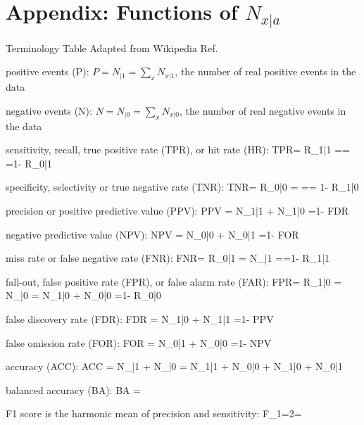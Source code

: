 \documentclass[12pt]{article}
\begin{document}
\appendix 

\section{Appendix: Functions of $N_{x|a}$}
\label{app-n-ratios}

Terminology Table
Adapted from Wikipedia Ref.\cite{wiki-roc}

positive events (P):
$P=N_{|1}=\sum_x N_{x|1}$,
the number of real positive 
events in the data

negative events (N):
$N=N_{|0}=\sum_x N_{x|0}$,
the number of real negative events in the data


sensitivity, recall, true positive rate (TPR),
or hit rate  ({\color{red}HR}):
\beq TPR=
{  {R_{1|1}} ={}=
{}=1- {R_{0|1}} }
\eeq

specificity, selectivity or true negative rate (TNR):
\beq TNR=
{  {R_{0|0}} ={}
={}=
1- {R_{1|0}} }
\eeq

precision or positive predictive value (PPV):
\beq 
{  {PPV} ={
{ {N_{1|1}} + {N_{1|0}} }}=1- {FDR} }
\eeq

negative predictive value (NPV):
\beq 
{  {NPV} ={
{ {N_{0|0}} + {N_{0|1}} }}=1- {FOR} }
\eeq

miss rate or false negative rate (FNR):
\beq FNR=
{  {R_{0|1}} ={
{ {N_{|1}} }}={}=1- {R_{1|1}} }
\eeq

fall-out, false positive rate (FPR),
or false alarm rate ({\color{red}FAR}):
\beq FPR=
{  {R_{1|0}} ={
{ {N_{|0}} }}={
{ {N_{1|0}} + {N_{0|0}} }}=1- {R_{0|0}} }
\eeq

false discovery rate (FDR):
\beq 
{  {FDR} ={
{ {N_{1|0}} + {N_{1|1}} }}=1- {PPV} }
\eeq

false omission rate (FOR):
\beq 
{  {FOR} ={
{ {N_{0|1}} + {N_{0|0}} }}=1- {NPV} }
\eeq


accuracy (ACC):
\beq 
{  {ACC} ={
{ {N_{|1}} + {N_{|0}} }}={
{ {N_{1|1}} + {N_{0|0}} + {N_{1|0}} + {N_{0|1}}
 }}}
\eeq

balanced accuracy (BA):
\beq 
{  {BA} ={}}
\eeq

F1 score
is the harmonic mean of precision and sensitivity: 
\beq 
{  {F}_{1}=2=
{}}
\eeq
\end{document}
